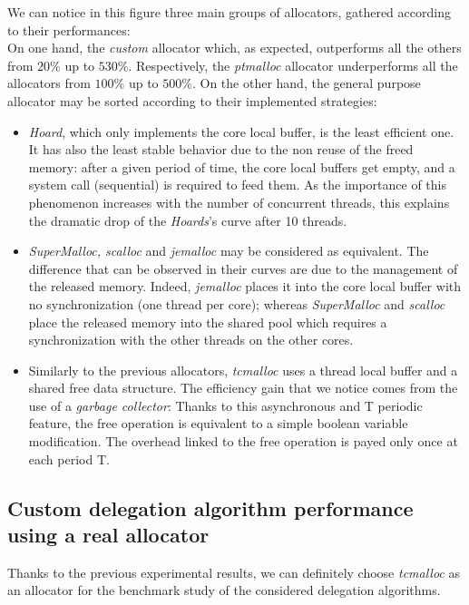 \documentclass[10pt]{article}											%
\begin{document}
We can notice in this figure three main groups of allocators, gathered according to their performances:\\
On one hand, the \textit{custom} allocator which, as expected, outperforms  all the others from $20\%$ up to $530\%$.   Respectively, the \emph{ptmalloc} allocator underperforms all the allocators from $100\%$ up to $500\%$.  On the other hand, the general purpose allocator may be sorted according to their implemented strategies:
\begin{itemize}
	\item \textit{Hoard}, which only implements the core local buffer, is the least efficient one.   It has also the least stable behavior due to the non reuse of the freed memory: after a given period of time, the core local buffers get empty, and a system call (sequential) is required to feed them.   As the importance of this phenomenon increases with the number of concurrent threads, this explains the dramatic drop of the \textit{Hoards}'s curve after 10 threads.

	\item \textit{SuperMalloc, scalloc} and \textit{jemalloc} may be considered as equivalent.   The difference that can be observed in their curves are due to the management of the released memory.   Indeed, \textit{jemalloc} places it into the core local buffer with no synchronization (one thread per core); whereas \textit{SuperMalloc} and \textit{scalloc} place the released memory into the shared pool which requires a synchronization with the other threads on the other cores.

	\item Similarly to the previous allocators, \textit{tcmalloc} uses a thread local buffer and a shared free data structure.    The efficiency gain that we notice comes from the use of a \textit{garbage collector}:  Thanks to this asynchronous and T periodic feature, the free operation is equivalent to a simple boolean variable modification.   The overhead linked to the free operation is payed only once at each period T.
\end{itemize}



\subsection{Custom delegation algorithm performance using a real allocator}
Thanks to the previous experimental results, we can definitely choose \textit{tcmalloc} as an allocator for the benchmark study of the considered delegation algorithms.
\end{document}
